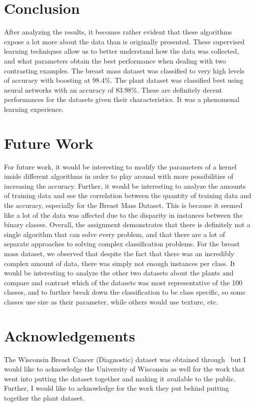 \documentclass[annual]{acmsiggraph}
\begin{document}
\section{Conclusion}
After analyzing the results, it becomes rather evident that these algorithms
expose a lot more about the data than is originally presented. These supervised
learning techniques allow us to better understand how the data was collected,
and what parameters obtain the best performance when dealing with two contrasting
examples. The breast mass dataset was classified to very high levels of accuracy
with boosting at 98.4\%. The plant dataset was classified best using neural networks
with an accuracy of 83.98\%. These are definitely decent performances for the
datasets given their characteristics. It was a phenomenal learning experience.
\section{Future Work}
For future work, it would be interesting to modify the parameters of a kernel
inside different algorithms in order to play around with more possibilities
of increasing the accuracy. Further, it would be interesting to analyze the
amounts of training data and see the correlation between the quantity of
training data and the accuracy, especially for the Breast Mass Dataset. This is
because it seemed like a lot of the data was affected due to the disparity
in instances between the binary classes. Overall, the assignment demonstrates
that there is definitely not a single algorithm that can solve every problem,
and that there are a lot of separate approaches to solving complex classification
problems. For the breast mass dataset, we observed that despite the fact that
there was an incredibly complex amount of data, there was simply not enough
instances per class. It would be interesting to analyze the other two datasets
about the plants and compare and contrast which of the datasets was most representative
of the 100 classes, and to further break down the classification to be class specific,
so some classes use size as their parameter, while others would use texture, etc.

\section*{Acknowledgements}
The Wisconsin Breast Cancer (Diagnostic) dataset was obtained 
through~\cite{Frank+Asuncion:2010} but I would like to acknowledge the 
University of Wisconsin as well for the work that went into putting the
dataset together and making it available to the public. Further, I would like to
acknowledge \cite{Mallah:2013} for the work they put behind putting together
the plant dataset. 



\end{document}
